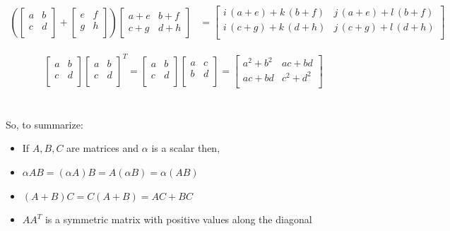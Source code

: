 \documentclass[MathsNotesBase.tex]{subfiles}
\begin{document}
{		\begin{align*}
			\left(
			\begin{bmatrix}
			a & b \\
			c & d \\
			\end{bmatrix}
			+
			\begin{bmatrix}
			e & f \\
			g & h \\
			\end{bmatrix}
			\right)
			\begin{bmatrix}
			a+e & b+f\\
			c+g & d+h
			\end{bmatrix}
			&=
			\begin{bmatrix}
			i\,{\left(a+e\right)}+k\,{\left(b+f\right)} & j\,{\left(a+e\right)}+l\,{\left(b+f\right)}\\
			i\,{\left(c+g\right)}+k\,{\left(d+h\right)} & j\,{\left(c+g\right)}+l\,{\left(d+h\right)}\\
			\end{bmatrix}
		\end{align*}
		
		\begin{align*}
			\begin{bmatrix}
			a & b \\
			c & d \\
			\end{bmatrix}
			\begin{bmatrix}
			a & b \\
			c & d \\
			\end{bmatrix}^{T}
			=
			\begin{bmatrix}
			a & b \\
			c & d \\
			\end{bmatrix}
			\begin{bmatrix}
			a & c \\
			b & d \\
			\end{bmatrix}
			=
			\begin{bmatrix}
			a^{2} + b^{2} & ac + bd \\
			ac + bd & c^{2} + d^{2} \\
			\end{bmatrix}		
		\end{align*}
		\\\\
		So, to summarize:
		\begin{itemize}
		\item[]{If $A,B,C$ are matrices and $\alpha$ is a scalar then,}
		\item{$\alpha AB = (\alpha A)B = A(\alpha B) = \alpha(AB)$}
		\item{$(A + B)C = C(A + B) = AC + BC$}
		\item{$AA^{T}$ is a symmetric matrix with positive values along the diagonal}
		\end{itemize}
		
}
\end{document}
